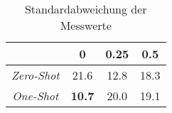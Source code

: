 \bgroup
\def\arraystretch{2}
\begin{table}[H]
	\vspace{.5cm}
	\centering		
	\begin{center}
		\begin{tabular}{|c||c|c|c|}
			\hline 
			& 0 & 0.25 & 0.5 \\
			\hline 
			\hline
			\textit{Zero-Shot} & 21.6 & 12.8 & 18.3 \\
			\hline
			\textit{One-Shot} & \textbf{10.7} & 20.0 & 19.1 \\
			\hline
		\end{tabular} 
	\end{center}
	\caption{Standardabweichung der Messwerte}
	\label{fig:branch-var}
	\vspace{-.8cm}
\end{table}
\egroup